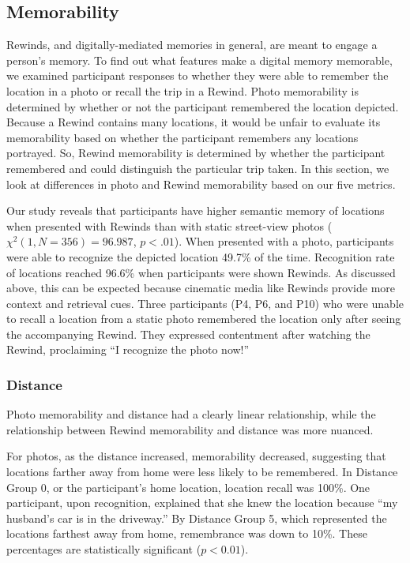 \documentclass{sigchi}
\begin{document}
\subsection{Memorability}
Rewinds, and digitally-mediated memories in general, are meant to engage a person's memory. To find out what features make a digital memory memorable, we examined participant responses to whether they were able to remember the location in a photo or recall the trip in a Rewind. Photo memorability is determined by whether or not the participant remembered the location depicted. Because a Rewind contains many locations, it would be unfair to evaluate its memorability based on whether the participant remembers any locations portrayed. So, Rewind memorability is determined by whether the participant remembered and could distinguish the particular trip taken. In this section, we look at differences in photo and Rewind memorability based on our five metrics.

Our study reveals that participants have higher semantic memory of locations when presented with Rewinds than with static street-view photos ($\chi^2(1, N=356) = 96.987$, $p < .01$). When presented with a photo, participants were able to recognize the depicted location 49.7\% of the time. Recognition rate of locations reached 96.6\% when participants were shown Rewinds. As discussed above, this can be expected because cinematic media like Rewinds provide more context and retrieval cues. Three participants (P4, P6, and P10) who were unable to recall a location from a static photo remembered the location only after seeing the accompanying Rewind. They expressed contentment after watching the Rewind, proclaiming ``I recognize the photo now!''

\subsubsection{Distance}
Photo memorability and distance had a clearly linear relationship, while the relationship between Rewind memorability and distance was more nuanced. 

For photos, as the distance increased, memorability decreased, suggesting that locations farther away from home were less likely to be remembered. In Distance Group 0, or the participant's home location, location recall was 100\%. One participant, upon recognition, explained that she knew the location because ``my husband's car is in the driveway.'' By Distance Group 5, which represented the locations farthest away from home, remembrance was down to 10\%. These percentages are statistically significant ($p < 0.01$). 
\end{document}
